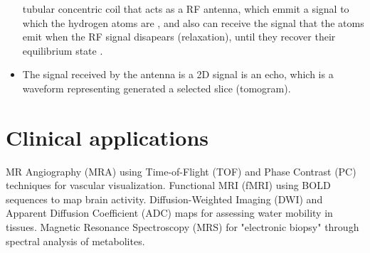 \begin{itemize}
  tubular concentric coil that acts as a RF antenna, which emmit a
  signal to which the hydrogen atoms are , and also can receive the signal
  that the atoms emit when the RF signal disapears (relaxation), until
  they recover their equilibrium state .
\item The signal received by the antenna is a 2D signal is an echo,
  which is a waveform representing  generated a selected slice (tomogram).
\end{itemize}

\section{Clinical applications}
MR Angiography (MRA) using Time-of-Flight (TOF) and Phase Contrast (PC) techniques for vascular visualization. Functional MRI (fMRI) using BOLD sequences to map brain activity. Diffusion-Weighted Imaging (DWI) and Apparent Diffusion Coefficient (ADC) maps for assessing water mobility in tissues. Magnetic Resonance Spectroscopy (MRS) for "electronic biopsy" through spectral analysis of metabolites.


